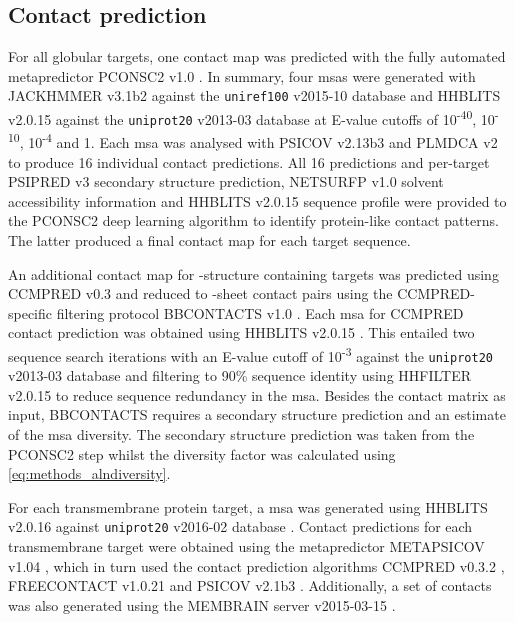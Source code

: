 \subsection{Contact prediction} \label{sec:ample_proof_conpred}
For all globular targets, one contact map was predicted with the fully automated metapredictor PCONSC2 v1.0 \cite{Skwark2014-qp}. In summary, four \gls{msa}s were generated with JACKHMMER v3.1b2 \cite{Johnson2010-uz} against the \texttt{uniref100} v2015-10 database and HHBLITS v2.0.15 \cite{Remmert2011-kt} against the \texttt{uniprot20} v2013-03 database \cite{Bateman2017-pb} at E-value cutoffs of 10\textsuperscript{-40}, 10\textsuperscript{-10}, 10\textsuperscript{-4} and 1. Each \gls{msa} was analysed with PSICOV v2.13b3 \cite{Jones2012-ks} and PLMDCA v2 \cite{Ekeberg2014-kf} to produce 16 individual contact predictions. All 16 predictions and per-target PSIPRED v3 \cite{Jones1999-ed} secondary structure prediction, NETSURFP v1.0 \cite{Petersen2009-wy} solvent accessibility information and HHBLITS v2.0.15 \cite{Remmert2011-kt} sequence profile were provided to the PCONSC2 deep learning algorithm \cite{Skwark2014-qp} to identify protein-like contact patterns. The latter produced a final contact map for each target sequence.

An additional contact map for \textbeta-structure containing targets was predicted using CCMPRED v0.3 \cite{Seemayer2014-zp} and reduced to \textbeta-sheet contact pairs using the CCMPRED-specific filtering protocol BBCONTACTS v1.0 \cite{Andreani2015-qn}. Each \gls{msa} for CCMPRED contact prediction was obtained using HHBLITS v2.0.15 \cite{Remmert2011-kt}. This entailed two sequence search iterations with an E-value cutoff of 10\textsuperscript{-3} against the \texttt{uniprot20} v2013-03 database \cite{Bateman2017-pb} and filtering to 90\% sequence identity using HHFILTER v2.0.15 \cite{Remmert2011-kt} to reduce sequence redundancy in the \gls{msa}. Besides the contact matrix as input, BBCONTACTS requires a secondary structure prediction and an estimate of the \gls{msa} diversity. The secondary structure prediction was taken from the PCONSC2 step whilst the diversity factor was calculated using \cref{eq:methods_alndiversity}.

For each transmembrane protein target, a \gls{msa} was generated using HHBLITS v2.0.16 \cite{Remmert2011-kt} against \texttt{uniprot20} v2016-02 database \cite{Bateman2017-pb}. Contact predictions for each transmembrane target were obtained using the metapredictor METAPSICOV v1.04 \cite{Jones2015-vq}, which in turn used the contact prediction algorithms CCMPRED v0.3.2 \cite{Seemayer2014-zp}, FREECONTACT v1.0.21 \cite{Kajan2014-bx} and PSICOV v2.1b3 \cite{Jones2012-ks}. Additionally, a set of contacts was also generated using the MEMBRAIN server v2015-03-15 \cite{Yang2013-bf}.

